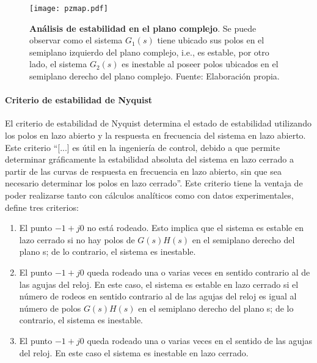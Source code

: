                 \begin{figure}[htb]
                    \centering
                    \texttt{[image: pzmap.pdf]}
                    \caption[Ejemplo de análisis de estabilidad en el plano complejo]{\textbf{Análisis de estabilidad en el plano complejo}. Se puede observar como el sistema $G_1(s)$ tiene ubicado sus polos en el semiplano izquierdo del plano complejo, i.e., es estable, por otro lado, el sistema $G_2(s)$ es inestable al poseer polos ubicados en el semiplano derecho del plano complejo. Fuente: Elaboración propia.} 
                    \label{fig:pzmap}
                \end{figure}
            
            \paragraph{Criterio de estabilidad de Nyquist}
                
                El criterio de estabilidad de Nyquist determina el estado de estabilidad utilizando los polos en lazo abierto y la respuesta en frecuencia del sistema en lazo abierto. Este criterio \enquote{[...] es útil en la ingeniería de control, debido a que permite determinar gráficamente la estabilidad absoluta del sistema en lazo cerrado a partir de las curvas de respuesta en frecuencia en lazo abierto, sin que sea necesario determinar los polos en lazo cerrado}\Parencite[p.$\,$446]{ogata2003ingenieria}. Este criterio tiene la ventaja de poder realizarse tanto con cálculos analíticos como con datos experimentales, \textcite{ogata2003ingenieria} define tres criterios:

                \begin{enumerate}[leftmargin=\parindent]
                    \item El punto $-1 + j0$ no está rodeado. Esto implica que el sistema es estable en lazo cerrado si no hay polos de $G(s)H(s)$ en el semiplano derecho del plano s; de lo contrario, el sistema es inestable.
                    \item El punto $-1 + j0$ queda rodeado una o varias veces en sentido contrario al de las agujas
                    del reloj. En este caso, el sistema es estable en lazo cerrado si el número de rodeos en sentido contrario
                    al de las agujas del reloj es igual al número de polos $G(s)H(s)$ en el semiplano derecho
                    del plano s; de lo contrario, el sistema es inestable.


                    \item El punto $-1 + j0$ queda rodeado una o varias veces en el sentido de las agujas del reloj.
                    En este caso el sistema es inestable en lazo cerrado.
                \end{enumerate}
                
